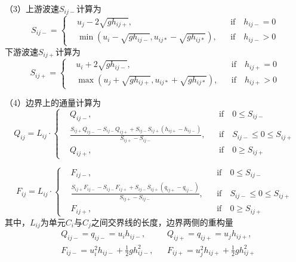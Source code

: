 （3）上游波速$S_{ij-}$计算为
\begin{equation}
  S_{ij-} = \left\{
    \begin{aligned}
      &u_j - 2\sqrt{gh_{ij+}}, && \mbox{if} \quad h_{ij-} = 0 \\
      & \min \left(u_i - \sqrt{gh_{ij-}}, u_{ij*} - \sqrt{gh_{ij*}}\right), && \mbox{if} \quad h_{ij-} > 0
  \end{aligned}\right.
\end{equation}
下游波速$S_{ij+}$计算为
\begin{equation}
  S_{ij+} = \left\{
    \begin{aligned}
      &u_i + 2\sqrt{gh_{ij-}}, && \mbox{if} \quad h_{ij+} = 0 \\
      & \max \left(u_j + \sqrt{gh_{ij+}}, u_{ij*} + \sqrt{gh_{ij*}}\right), && \mbox{if} \quad h_{ij+} > 0
  \end{aligned}\right.
\end{equation}

（4）边界上的通量计算为
\begin{equation}
  Q_{ij} = L_{ij} \cdot \left\{
    \begin{aligned}
      & Q_{ij-}, && \mbox{if} \quad 0\leqslant S_{ij-} \\
      & \frac{S_{ij+} Q_{ij-} - S_{ij-} Q_{ij+} + S_{ij-} S_{ij+} \left(h_{ij+} - h_{ij-}\right)}{S_{ij+}-S_{ij-}} , && \mbox{if} \quad S_{ij-} \leqslant 0\leqslant S_{ij+}\\
      & Q_{ij+}, && \mbox{if} \quad 0\geqslant S_{ij+}
  \end{aligned}\right.
\end{equation}

\begin{equation}
  F_{ij} = L_{ij} \cdot \left\{
  \begin{aligned}
   & F_{ij-}, && \mbox{if} \quad 0\leqslant S_{ij-} \\
   & \frac{S_{ij+} F_{ij-} - S_{ij-} F_{ij+} + S_{ij-} S_{ij+} \left(q_{ij+} - q_{ij-}\right)}{S_{ij+}-S_{ij-}} , && \mbox{if} \quad S_{ij-} \leqslant 0\leqslant S_{ij+}\\
   & F_{ij+}, && \mbox{if} \quad 0\geqslant S_{ij+}
  \end{aligned}\right.
\end{equation}
其中，$L_{ij}$为单元$C_i$与$C_j$之间交界线的长度，边界两侧的重构量
\begin{align*}
  &Q_{ij-} = q_{ij-} = u_i h_{ij-},  && Q_{ij+} = q_{ij+} = u_j h_{ij+}, \\
  &F_{ij-} = u_i^2h_{ij-}+\frac{1}{2}gh_{ij-}^2, && F_{ij+} = u_j^2h_{ij+}+\frac{1}{2}gh_{ij+}^2
\end{align*}

